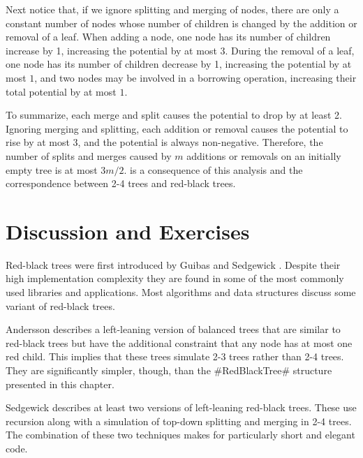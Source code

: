 Next notice that, if we ignore splitting and merging of nodes, there
are only a constant number of nodes whose number of children is changed
by the addition or removal of a leaf.  When adding a node, one node
has its number of children increase by 1, increasing the potential by
at most $3$.  During the removal of a leaf, one node has its number of
children decrease by 1, increasing the potential by at most $1$, and two
nodes may be involved in a borrowing operation, increasing their total
potential by at most $1$.

To summarize, each merge and split causes the potential to drop by
at least 2.  Ignoring merging and splitting, each addition or removal
causes the potential to rise by at most 3, and the potential is always
non-negative.  Therefore, the number of splits and merges caused by $m$
additions or removals on an initially empty tree is at most $3m/2$.
 is a consequence of this analysis and the
correspondence between 2-4 trees and red-black trees.

\section{Discussion and Exercises}

Red-black trees were first introduced by Guibas and Sedgewick \cite{gs78}.
Despite their high implementation complexity they are found in some of
the most commonly used libraries and applications.  Most algorithms and
data structures discuss some variant of red-black trees.

Andersson \cite{a93} describes a left-leaning version of balanced trees
that are similar to red-black trees but have the additional constraint
that any node has at most one red child.  This implies that these trees
simulate 2-3 trees rather than 2-4 trees.  They are significantly simpler,
though, than the #RedBlackTree# structure presented in this chapter.

Sedgewick \cite{s08} describes at least two versions of left-leaning
red-black trees.  These use recursion along with a simulation of
top-down splitting and merging in 2-4 trees. The combination of these
two techniques makes for particularly short and elegant code.

